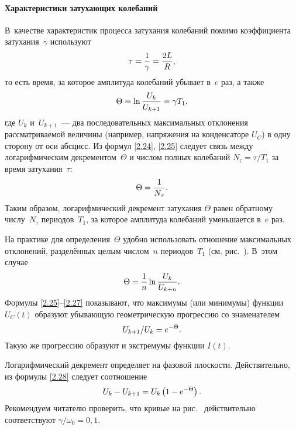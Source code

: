 \paragraph{Характеристики затухающих колебаний}
В~качестве характеристик процесса затухания колебаний помимо коэффициента
затухания~$\gamma$ используют 
\begin{equation}\eqmark{2.24}
	\tau=\frac1\gamma=\frac{2L}{R},
\end{equation}
то есть время, за которое амплитуда колебаний убывает в~$e$ раз, а также
\begin{equation}\eqmark{2.25}
	\Theta=\ln\dfrac{U_{k}}{U_{k+1}}=\gamma T_1,
\end{equation}
где $U_{k}$ и~$U_{k+1}$~--- два последовательных максимальных отклонения
рассматриваемой величины (например, напряжения на конденсаторе $U_C$) в одну
сторону от оси абсцисс. Из формул \eqref{2.24}, \eqref{2.25} следует связь между
логарифмическим декрементом~$\Theta$ и числом полных колебаний $N_{\tau}=\tau/T_1$ за
время затухания~$\tau$:
\begin{equation}\eqmark{2.26}
\Theta=\frac{1}{N_{\tau}}.
\end{equation}
Таким образом, логарифмический декремент затухания $\Theta$ равен обратному
числу~$N_{\tau}$ периодов~$T_1$, за которое амплитуда колебаний уменьшается в~$e$ раз.

На практике для определения~$\Theta$ удобно использовать отношение максимальных
отклонений, разделённых целым числом~$n$ периодов~$T_1$ (см.
рис.~). В~этом случае
\begin{equation}\eqmark{2.27}
\Theta=\dfrac{1}{n}\ln\dfrac{U_{k}}{U_{k+n}}.
\end{equation}
Формулы \eqref{2.25}--\eqref{2.27} показывают, что максимумы (или минимумы)
функции $U_C(t)$ образуют убывающую геометрическую прогрессию со знаменателем
\begin{equation}\eqmark{2.28}
U_{k+1}/U_{k}=e^{-\Theta}.
\end{equation}
Такую же прогрессию образуют и экстремумы функции $I(t)$.

Логарифмический декремент определяет  на фазовой плоскости. Действительно, из формулы \eqref{2.28} следует 
соотношение
\begin{equation}\eqmark{2.29}
	U_{k}-U_{k+1}=U_{k}\left(1-e^{-\Theta}\right).
\end{equation}
Рекомендуем читателю проверить, что кривые на рис.~ 
действительно соответствуют $\gamma/\omega_0=0,1$.

